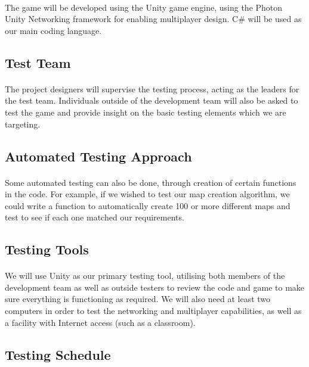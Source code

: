 \documentclass[12pt, titlepage]{article}
\begin{document}
\paragraph{}The game will be developed using the Unity game engine, using the Photon Unity Networking framework for enabling multiplayer design. C\# will be used as our main coding language.
\subsection{Test Team}
\paragraph{}The project designers will supervise the testing process, acting as the leaders for the test team. Individuals outside of the development team will also be asked to test the game and provide insight on the basic testing elements which we are targeting. 
\subsection{Automated Testing Approach}
\paragraph{}Some automated testing can also be done, through creation of certain functions in the code. For example, if we wished to test our map creation algorithm, we could write a function to automatically create 100 or more different maps and test to see if each one matched our requirements. 
\subsection{Testing Tools}
\paragraph{}We will use Unity as our primary testing tool, utilising both members of the development team as well as outside testers to review the code and game to make sure everything is functioning as required. We will also need at least two computers  in order to test the networking and multiplayer capabilities, as well as a facility with Internet access (such as a classroom).
\subsection{Testing Schedule}
\end{document}

